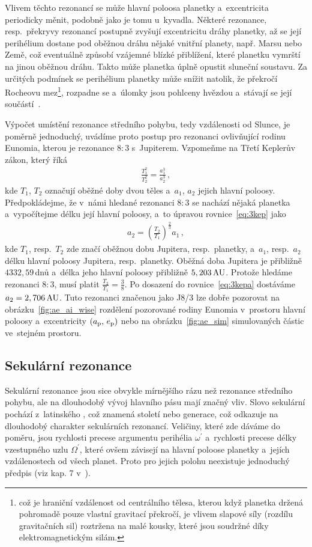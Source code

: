 \documentclass[A4paper, 12pt, oneside, openany]{book}
\begin{document}
Vlivem těchto rezonancí se může hlavní poloosa planetky a~excentricita periodicky měnit, podobně jako je tomu u~kyvadla. Některé rezonance, resp.\ překryvy rezonancí postupně zvyšují excentricitu dráhy planetky, až se její perihélium dostane pod oběžnou dráhu nějaké vnitřní planety, např. Marsu nebo Země, což eventuálně způsobí vzájemné blízké přiblížení, které planetku vymrští na jinou oběžnou dráhu. Takto může planetka úplně opustit sluneční soustavu. Za určitých podmínek se perihélium planetky může snížit natolik, že překročí Rocheovu mez\footnote{což je hraniční vzdálenost od centrálního tělesa, kterou když planetka držená pohromadě pouze vlastní gravitací překročí, je vlivem slapové síly (rozdílu gravitačních sil) roztržena na malé kousky, které jsou soudržné díky elektromagnetickým silám.}, rozpadne se a~úlomky jsou pohlceny hvězdou a~stávají se její součástí~\cite{pichierri17}.

Výpočet umístění rezonance středního pohybu, tedy vzdálenosti od Slunce, je poměrně jednoduchý, uvádíme proto postup pro rezonanci ovlivňující rodinu Eunomia, kterou je rezonance $8:3$ s~Jupiterem. Vzpomeňme na Třetí Keplerův zákon, který říká
\begin{align} \label{eq:3kep}
	\frac{T_1^2}{T_2^2}=\frac{a_1^3}{a_2^3}\,, 
\end{align}
kde $T_1$, $T_2$ označují oběžné doby dvou těles a~$a_1$, $a_2$ jejich hlavní poloosy. Předpokládejme, že v~námi hledané rezonanci $8:3$ se nachází nějaká planetka a~vypočítejme délku její hlavní poloosy, a~to úpravou rovnice~\eqref{eq:3kep} jako
\begin{align} \label{eq:3kepa}
	a_2=\left(\frac{T_2}{T_1}\right)^{\frac{2}{3}}a_1\,,
\end{align}
kde $T_1$, resp.\ $T_2$ zde značí oběžnou dobu Jupitera, resp.\ planetky, a~$a_1$, resp.\ $a_2$ délku hlavní poloosy Jupitera, resp.\ planetky. Oběžná doba Jupitera je přibližně $4332,59\,$dnů a~délka jeho hlavní poloosy přibližně $5,203\,{\rm AU}$. Protože hledáme rezonanci $8:3$, musí platit $\frac{T_2}{T_1}=\frac{3}{8}$. Po dosazení do rovnice~\eqref{eq:3kepa} dostáváme $a_2=2,706\,{\rm AU}$. Tuto rezonanci značenou jako J8/3 lze dobře pozorovat na obrázku~\ref{fig:ae_ai_wise} rozdělení pozorované rodiny Eunomia v~prostoru hlavní poloosy a~excentricity $(a_{\rm p},\,e_{\rm p})$ nebo na obrázku~\ref{fig:ae_sim} simulovaných částic ve~stejném prostoru.
\subsection{Sekulární rezonance} 
Sekulární rezonance jsou sice obvykle mírnějšího rázu než rezonance středního pohybu, ale na dlouhodobý vývoj hlavního pásu mají značný vliv. Slovo sekulární pochází z~latinského , což znamená století nebo generace, což odkazuje na dlouhodobý charakter sekulárních rezonancí. Veličiny, které zde dáváme do poměru, jsou rychlosti precese argumentu perihélia $\omega^\prime$ a~rychlosti precese délky vzestupného uzlu $\Omega^\prime$, které ovšem závisejí na hlavní poloose planetky a~jejích vzdálenostech od všech planet. Proto pro jejich polohu neexistuje jednoduchý předpis (viz kap. 7 v~\cite{murray00}).
\end{document}
